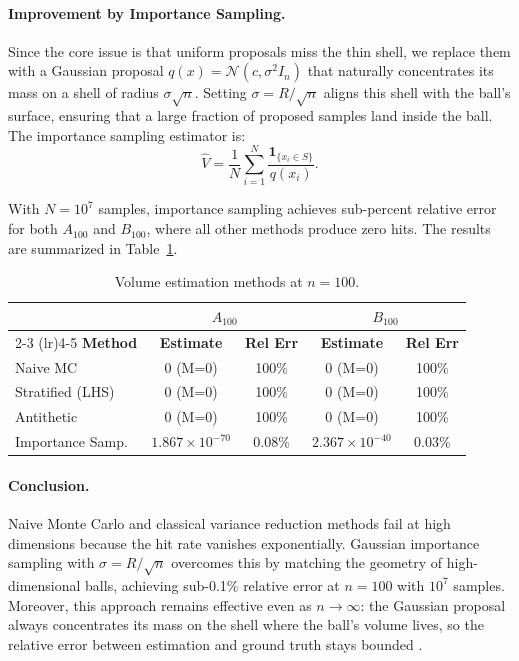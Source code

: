 \documentclass[a4paper,10pt]{article}
\theoremstyle{nonumberplain}
\theoremstyle{nonumberplain}
\theoremstyle{nonumberplain}
\theoremstyle{nonumberplain}
\begin{document}
\paragraph{Improvement by Importance Sampling.}

Since the core issue is that uniform proposals miss the thin shell, we replace them with a Gaussian proposal $q(x) = \mathcal{N}(c, \sigma^2 I_n)$ that naturally concentrates its mass on a shell of radius $\sigma\sqrt{n}$. Setting $\sigma = R/\sqrt{n}$ aligns this shell with the ball's surface, ensuring that a large fraction of proposed samples land inside the ball. The importance sampling estimator \cite{agapiou2017} is:
$$\hat{V} = \frac{1}{N} \sum_{i=1}^N \frac{\textbf{1}_{\{x_i \in S\}}}{q(x_i)}.$$

With $N = 10^7$ samples, importance sampling achieves sub-percent relative error for both $A_{100}$ and $B_{100}$, where all other methods produce zero hits. The results are summarized in Table~\ref{tab:q1c}.

\begin{table}[hbt!]
\centering
\caption{Volume estimation methods at $n=100$.}
\label{tab:q1c}
\renewcommand{\arraystretch}{1.5}
\small
\begin{tabular}{lcccc}
\hline
& \multicolumn{2}{c}{$A_{100}$} & \multicolumn{2}{c}{$B_{100}$} \\
\cmidrule(lr){2-3} \cmidrule(lr){4-5}
\textbf{Method} & \textbf{Estimate} & \textbf{Rel Err} & \textbf{Estimate} & \textbf{Rel Err} \\
\hline
Naive MC          & 0 (M=0)                  & 100\%  & 0 (M=0)                  & 100\% \\
Stratified (LHS)  & 0 (M=0)                  & 100\%  & 0 (M=0)                  & 100\% \\
Antithetic         & 0 (M=0)                  & 100\%  & 0 (M=0)                  & 100\% \\
Importance Samp.  & $1.867 \times 10^{-70}$  & 0.08\% & $2.367 \times 10^{-40}$  & 0.03\% \\
\hline
\end{tabular}
\end{table}

\paragraph{Conclusion.} 

Naive Monte Carlo and classical variance reduction methods fail at high dimensions because the hit rate vanishes exponentially. Gaussian importance sampling with $\sigma = R/\sqrt{n}$ overcomes this by matching the geometry of high-dimensional balls, achieving sub-0.1\% relative error at $n = 100$ with $10^7$ samples. Moreover, this approach remains effective even as $n \to \infty$: the Gaussian proposal always concentrates its mass on the shell where the ball's volume lives, so the relative error between estimation and ground truth stays bounded \cite{agapiou2017}.
\end{document}
